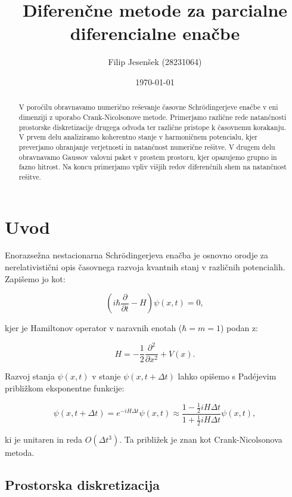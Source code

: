 \documentclass[12pt,a4paper]{article}
\title{Diferenčne metode za parcialne diferencialne enačbe}
\author{Filip Jesenšek (28231064)}
\date{\today}
\begin{document}
\maketitle

\begin{abstract}
V poročilu obravnavamo numerično reševanje časovne Schrödingerjeve enačbe v eni dimenziji z uporabo Crank-Nicolsonove metode. Primerjamo različne rede natančnosti prostorske diskretizacije drugega odvoda ter različne pristope k časovnemu korakanju. V prvem delu analiziramo koherentno stanje v harmoničnem potencialu, kjer preverjamo ohranjanje verjetnosti in natančnost numerične rešitve. V drugem delu obravnavamo Gaussov valovni paket v prostem prostoru, kjer opazujemo grupno in fazno hitrost. Na koncu primerjamo vpliv višjih redov diferenčnih shem na natančnost rešitve.
\end{abstract}

\section{Uvod}

Enorazsežna nestacionarna Schrödingerjeva enačba je osnovno orodje za nerelativistični opis časovnega razvoja kvantnih stanj v različnih potencialih. Zapišemo jo kot:

\begin{equation}
\left( i\hbar \frac{\partial}{\partial t} - H \right) \psi(x, t) = 0,
\end{equation}

kjer je Hamiltonov operator v naravnih enotah ($\hbar = m = 1$) podan z:

\begin{equation}
H = -\frac{1}{2} \frac{\partial^2}{\partial x^2} + V(x).
\end{equation}

Razvoj stanja $\psi(x, t)$ v stanje $\psi(x, t + \Delta t)$ lahko opišemo s Padéjevim približkom eksponentne funkcije:

\begin{equation}
\psi(x, t + \Delta t) = e^{-iH\Delta t} \psi(x, t) \approx \frac{1 - \frac{1}{2}iH\Delta t}{1 + \frac{1}{2}iH\Delta t} \psi(x, t),
\end{equation}

ki je unitaren in reda $O(\Delta t^3)$. Ta približek je znan kot Crank-Nicolsonova metoda.

\subsection{Prostorska diskretizacija}
\end{document}
